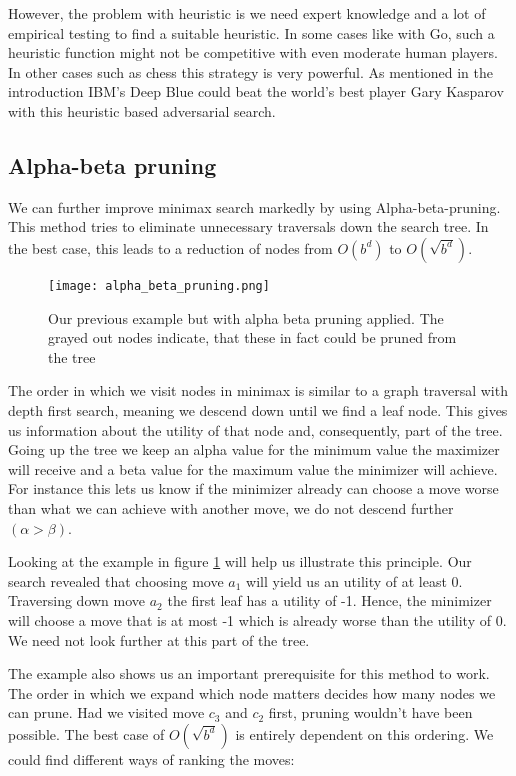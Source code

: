 However, the problem with heuristic is we need expert knowledge and a lot of empirical testing to find a suitable heuristic. In some cases like with Go, such a heuristic function might not be competitive with even moderate human players. In other cases such as chess this strategy is very powerful. As mentioned in the introduction IBM's Deep Blue could beat the world's best player Gary Kasparov with this heuristic based adversarial search.

\subsection{Alpha-beta pruning}
We can further improve minimax search markedly by using Alpha-beta-pruning. This method tries to eliminate unnecessary traversals down the search tree. In the best case, this leads to a reduction of nodes from $ O(b^d) $ to $ O(\sqrt{b^d}) $.

\begin{figure}
    \centering
    \texttt{[image: alpha\_beta\_pruning.png]}
    \caption{Our previous example but with alpha beta pruning applied. The grayed out nodes indicate, that these in fact could be pruned from the tree}
    \label{alpha_beta_pruning}
\end{figure}

The order in which we visit nodes in minimax is similar to a graph traversal with depth first search, meaning we descend down until we find a leaf node. This gives us information about the utility of that node and, consequently, part of the tree. Going up the tree we keep an alpha value for the minimum value the maximizer will receive and a beta value for the maximum value the minimizer will achieve. For instance this lets us know if the minimizer already can choose a move worse than what we can achieve with another move, we do not descend further $ (\alpha > \beta) $.

Looking at the example in figure \ref{alpha_beta_pruning} will help us illustrate this principle. Our search revealed that choosing move $ a_1 $ will yield us an utility of at least 0. Traversing down move $ a_2 $ the first leaf has a utility of -1. Hence, the minimizer will choose a move that is at most -1 which is already worse than the utility of 0. We need not look further at this part of the tree.

The example also shows us an important prerequisite for this method to work. The order in which we expand which node matters decides how many nodes we can prune. Had we visited move $ c_3 $ and $ c_2 $ first, pruning wouldn't have been possible. The best case of $ O(\sqrt{b^d}) $ is entirely dependent on this ordering. We could find different ways of ranking the moves:

